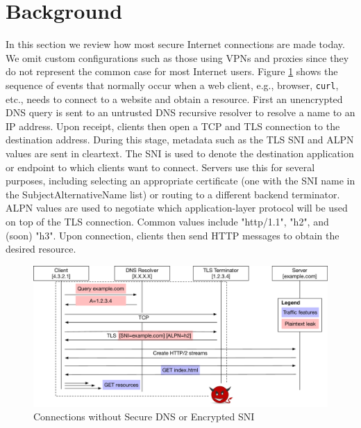 \documentclass[runningheads]{llncs}
\begin{document}

\section{Background}
In this section we review how most secure Internet connections are made today. We omit custom
configurations such as those using VPNs and proxies since they do not represent the common case
for most Internet users. Figure \ref{fig:connections-then} shows the sequence of events that
normally occur when a web client, e.g., browser, {\tt curl}, etc., needs to connect to a website
and obtain a resource. First an unencrypted DNS query is sent to an untrusted DNS recursive
resolver to resolve a name to an IP address. Upon receipt, clients then open a TCP and TLS
connection to the destination address. During this stage, metadata such as the TLS SNI and ALPN
values are sent in cleartext. The SNI is used to denote the destination application or endpoint
to which clients want to connect. Servers use this for several purposes, including selecting
an appropriate certificate (one with the SNI name in the SubjectAlternativeName list) or
routing to a different backend terminator. ALPN values are used to negotiate which application-layer
protocol will be used on top of the TLS connection. Common values include "http/1.1", "h2", and
(soon) "h3". Upon connection, clients then send HTTP messages to obtain the desired resource.

\begin{figure}
\includegraphics[scale=0.35]{figures/connection_flow}
\caption{Connections without Secure DNS or Encrypted SNI}
\label{fig:connections-then}
\end{figure}
\end{document}
